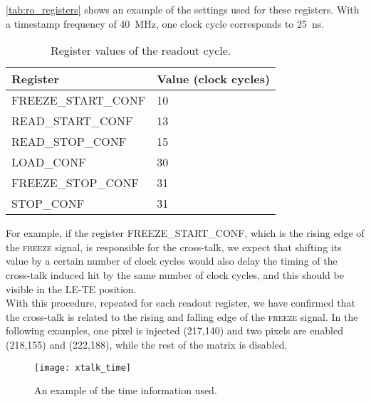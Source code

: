 \autoref{tab:ro_registers} shows an example of the settings used for these registers. With a timestamp frequency of \SI{40}{MHz}, one clock cycle corresponds to \SI{25}{ns}. 


\begin{table}[h!]
\centering
\begin{tabular}{C{5cm}|C{3cm}}
\hline
\hline
Register & Value (clock cycles) \\
\hline
\hline
\textsc{FREEZE\_START\_CONF} & 10\\[0.3ex]
\hline
\textsc{READ\_START\_CONF}& 13 \\[0.3ex]
\hline
\textsc{READ\_STOP\_CONF} & 15 \\[0.3ex]
\hline
\textsc{LOAD\_CONF} & 30 \\[0.3ex]
\hline
\textsc{FREEZE\_STOP\_CONF} & 31\\[0.3ex]
\hline
\textsc{STOP\_CONF} & 31\\[0.3ex]
\hline
\hline
\end{tabular}
\caption{Register values of the readout cycle.}
\label{tab:ro_registers}
\end{table}

For example, if the register \textsc{FREEZE\_START\_CONF}, which is the rising edge of the \textsc{freeze} signal, is responsible for the cross-talk, we expect that shifting its value by a certain number of clock cycles would also delay the timing of the cross-talk induced hit by the same number of clock cycles, and this should be visible in the LE-TE position. \\


With this procedure, repeated for each readout register, we have confirmed that the cross-talk is related to the rising and falling edge of the \textsc{freeze} signal. In the following examples, one pixel is injected (217,140) and two pixels are enabled (218,155) and (222,188), while the rest of the matrix is disabled.

\begin{figure}[h!]
\centering
\texttt{[image: xtalk\_time]}
\caption{An example of the time information used.}
\label{fig:xtalk_tab}
\end{figure}

